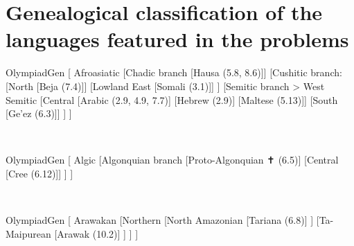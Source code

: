 \documentclass{langscibook}
\begin{document}
	\appendix
	\chapter{Genealogical classification of the languages featured in the problems} 
	\begin{forest} OlympiadGen
		[\OlympiadGenCounter{} Afroasiatic
			[{Chadic branch} [{Hausa (5.8, 8.6)}]]
			[{Cushitic branch}:
				[North [Beja (7.4)]]
				[Lowland East [Somali (3.1)]]
			]
			[{Semitic branch > West Semitic}
				[Central 
				[{Arabic (2.9, 4.9, 7.7)}] [Hebrew (2.9)] [Maltese (5.13)]]
				[South [Ge'ez (6.3)]]
			]
		]
	\end{forest}\\
	\begin{forest} OlympiadGen
		[\OlympiadGenCounter{} Algic
			[Algonquian branch
				[Proto-Algonquian ✝ (6.5)]
				[Central [Cree (6.12)]]
			]
		]
	\end{forest}\\
	\begin{forest} OlympiadGen
		[\OlympiadGenCounter{} Arawakan
			[Northern
				[North Amazonian
					[Tariana (6.8)]
				]
				[Ta-Maipurean
					[Arawak (10.2)]
				]
			]
		]
	\end{forest}
\end{document}
